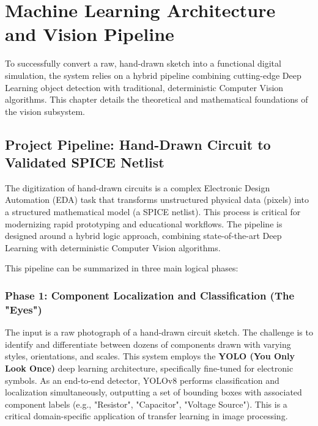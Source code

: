 \chapter{Machine Learning Architecture and Vision Pipeline}

To successfully convert a raw, hand-drawn sketch into a functional digital simulation, the system relies on a hybrid pipeline combining cutting-edge Deep Learning object detection with traditional, deterministic Computer Vision algorithms. This chapter details the theoretical and mathematical foundations of the vision subsystem.

\section{Project Pipeline: Hand-Drawn Circuit to Validated SPICE Netlist}
The digitization of hand-drawn circuits is a complex Electronic Design Automation (EDA) task that transforms unstructured physical data (pixels) into a structured mathematical model (a SPICE netlist). This process is critical for modernizing rapid prototyping and educational workflows. The pipeline is designed around a hybrid logic approach, combining state-of-the-art Deep Learning with deterministic Computer Vision algorithms.

This pipeline can be summarized in three main logical phases:

\subsection{Phase 1: Component Localization and Classification (The "Eyes")}
The input is a raw photograph of a hand-drawn circuit sketch. The challenge is to identify and differentiate between dozens of components drawn with varying styles, orientations, and scales. This system employs the \textbf{YOLO (You Only Look Once)} deep learning architecture, specifically fine-tuned for electronic symbols. As an end-to-end detector, YOLOv8 performs classification and localization simultaneously, outputting a set of bounding boxes with associated component labels (e.g., "Resistor", "Capacitor", "Voltage Source"). This is a critical domain-specific application of transfer learning in image processing.

